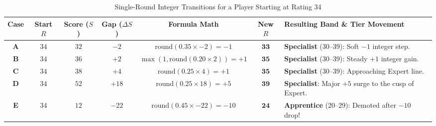 \begin{table}[htbp]
\centering
\scriptsize
\begin{tabular}{|c|c|c|c|c|c|p{5.4cm}|}
\hline
\rowcolor{primaryBlue!15}
\textbf{Case} & \textbf{Start $R$} & \textbf{Score ($S$)} & \textbf{Gap ($\Delta S$)} & \textbf{Formula Math} & \textbf{New $R$} & \textbf{Resulting Band \& Tier Movement} \\ \hline
\textbf{A} & $34$ & $32$ & $-2$ & $\text{round}(0.35 \times -2) = -1$ & $\mathbf{33}$ & \textbf{Specialist} (30--39): Soft $-1$ integer step. \\ \hline
\textbf{B} & $34$ & $36$ & $+2$ & $\max(1, \text{round}(0.20 \times 2)) = +1$ & $\mathbf{35}$ & \textbf{Specialist} (30--39): Steady $+1$ integer gain. \\ \hline
\textbf{C} & $34$ & $38$ & $+4$ & $\text{round}(0.25 \times 4) = +1$ & $\mathbf{35}$ & \textbf{Specialist} (30--39): Approaching Expert line. \\ \hline
\textbf{D} & $34$ & $52$ & $+18$ & $\text{round}(0.25 \times 18) = +5$ & $\mathbf{39}$ & \textbf{Specialist}: Major $+5$ surge to the cusp of Expert. \\ \hline
\textbf{E} & $34$ & $12$ & $-22$ & $\text{round}(0.45 \times -22) = -10$ & $\mathbf{24}$ & \textbf{Apprentice} (20--29): Demoted after $-10$ drop! \\ \hline
\end{tabular}
\caption{Single-Round Integer Transitions for a Player Starting at Rating 34}
\end{table}

